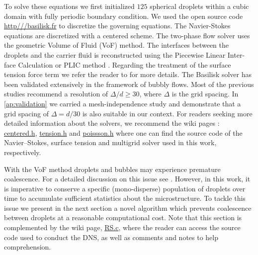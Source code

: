 To solve these equations we first initialized $125$ spherical droplets within a cubic domain with fully periodic boundary condition. 
We used the open source code \url{http///basilisk.fr} to discretize the governing equations. 
The Navier-Stokes equations are discretized with a centered scheme.
The two-phase flow solver uses the geometric Volume of Fluid (VoF) method. 
The interfaces between the droplets and the carrier fluid is reconstructed using the Piecewise Linear Inter-face Calculation or PLIC method \citet[Chapter 5.]{tryggvason2011direct}.
Regarding the treatment of the surface tension force term we refer the reader to \citet{popinet2018numerical} for more details. 
The Basilisk solver has been validated extensively in the framework of bubbly flows. 
Most of the previous studies \citep{hidman2023assessing,innocenti2020direct} recommend a resolution of $\Delta/d \ge  30$, where $\Delta$ is the grid spacing. 
In \ref{ap:validation} we carried a mesh-independence study and demonstrate that a grid spacing of $\Delta = d/30$ is also suitable in our context.
For readers seeking more detailed information about the solvers, we recommend the wiki pages : \href{http://basilisk.fr/src/navier-stokes/centered.h}{centered.h}, \href{http://basilisk.fr/src/tension.h}{tension.h} and \href{http://basilisk.fr/src/poissson.h}{poissson.h} where one can find the source code of the Navier--Stokes, surface tension and multigrid solver used in this work, respectively. 

With the VoF method droplets and bubbles may experience premature coalescence.
For a detailed discussion on this issue see  \citet[Appendix B]{innocenti2020direct}.
However, in this work, it is imperative to conserve a specific (mono-disperse) population of droplets over time to accumulate sufficient statistics about the microstructure.
To tackle this issue we present in the next section a novel algorithm which prevents coalescence between droplets at a reasonable computational cost. Note that this section is complemented by the wiki page, \href{http://basilisk.fr/sandbox/fintzin/Rising-Suspension/RS.c}{RS.c}, where the reader can access the source code used to conduct the DNS, as well as comments and notes to help comprehension. 





